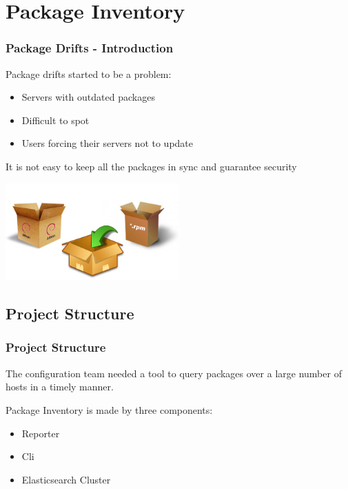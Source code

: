 \documentclass[aspectratio=169]{beamer}
\begin{document}
\section{Package Inventory}

\begin{frame}
    \frametitle{Package Drifts - Introduction}
    \vspace{10px}
    \begin{minipage}[t]{0.95\textwidth}
        Package drifts started to be a problem:
        \begin{itemize}
            \item Servers with outdated packages
            \item Difficult to spot
            \item Users forcing their servers not to update
        \end{itemize}
        It is not easy to keep all the packages in sync and guarantee security
    \end{minipage}
    \vspace{\belowdisplayskip}
    \begin{minipage}[t]{0.95\textwidth}
        \begin{center}
            \includegraphics[width=0.5\textwidth]{package.png}
        \end{center}
    \end{minipage}
\end{frame}


\subsection{Project Structure}
\begin{frame}
    \frametitle{Project Structure}
    The configuration team needed a tool to query packages over a large
    number of hosts in a timely manner.

    Package Inventory is made by three components:
    \begin{itemize}
        \item Reporter
        \item Cli
        \item Elasticsearch Cluster
    \end{itemize}
\end{frame}
\end{document}
